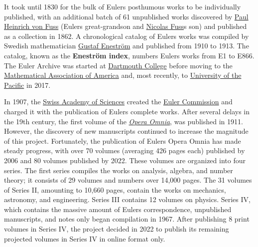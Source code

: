 It took until 1830 for the bulk of Euler\textquotesingle s posthumous works to be individually published, with an additional batch of 61 unpublished works discovered by \href{https://en.wikipedia.org/wiki/Paul_Heinrich_von_Fuss}{Paul Heinrich von Fuss} (Euler\textquotesingle s great-grandson and \href{https://en.wikipedia.org/wiki/Nicolas_Fuss}{Nicolas Fuss}\textquotesingle s son) and published as a collection in 1862. A chronological catalog of Euler\textquotesingle s works was compiled by Swedish mathematician \href{https://en.wikipedia.org/wiki/Gustaf_Eneström}{Gustaf Eneström} and published from 1910 to 1913. The catalog, known as the \textbf{Eneström index}, numbers Euler\textquotesingle s works from E1 to E866. The Euler Archive was started at \href{https://en.wikipedia.org/wiki/Dartmouth_College}{Dartmouth College} before moving to the \href{https://en.wikipedia.org/wiki/Mathematical_Association_of_America}{Mathematical Association of America} and, most recently, to \href{https://en.wikipedia.org/wiki/University_of_the_Pacific_(United_States)}{University of the Pacific} in 2017.

In 1907, the \href{https://en.wikipedia.org/wiki/Swiss_Academies_of_Arts_and_Sciences}{Swiss Academy of Sciences} created the \href{https://en.wikipedia.org/wiki/Euler_Commission}{Euler Commission} and charged it with the publication of Euler\textquotesingle s complete works. After several delays in the 19th century, the first volume of the \emph{\href{https://en.wikipedia.org/wiki/Opera_Omnia_Leonhard_Euler}{Opera Omnia}}, was published in 1911. However, the discovery of new manuscripts continued to increase the magnitude of this project. Fortunately, the publication of Euler\textquotesingle s Opera Omnia has made steady progress, with over 70 volumes (averaging 426 pages each) published by 2006 and 80 volumes published by 2022. These volumes are organized into four series. The first series compiles the works on analysis, algebra, and number theory; it consists of 29 volumes and numbers over 14,000 pages. The 31 volumes of Series II, amounting to 10,660 pages, contain the works on mechanics, astronomy, and engineering. Series III contains 12 volumes on physics. Series IV, which contains the massive amount of Euler\textquotesingle s correspondence, unpublished manuscripts, and notes only began compilation in 1967. After publishing 8 print volumes in Series IV, the project decided in 2022 to publish its remaining projected volumes in Series IV in online format only.

